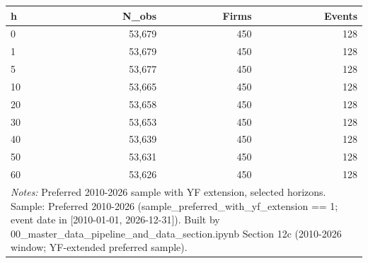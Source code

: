 \begin{tabular}{lrrr}
\toprule
h & N\_obs & Firms & Events \\
\midrule
0 & 53,679 & 450 & 128 \\
1 & 53,679 & 450 & 128 \\
5 & 53,677 & 450 & 128 \\
10 & 53,665 & 450 & 128 \\
20 & 53,658 & 450 & 128 \\
30 & 53,653 & 450 & 128 \\
40 & 53,639 & 450 & 128 \\
50 & 53,631 & 450 & 128 \\
60 & 53,626 & 450 & 128 \\
\bottomrule
\multicolumn{4}{p{0.95\linewidth}}{\footnotesize \textit{Notes:} Preferred 2010-2026 sample with YF extension, selected horizons. Sample: Preferred 2010-2026 (sample\_preferred\_with\_yf\_extension == 1; event date in [2010-01-01, 2026-12-31]). Built by 00\_master\_data\_pipeline\_and\_data\_section.ipynb Section 12c (2010-2026 window; YF-extended preferred sample).} \\
\end{tabular}
